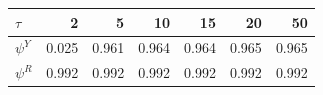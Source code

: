 \begin{tabular}{lrrrrrr}
\toprule
$\tau$ & 2 & 5 & 10 & 15 & 20 & 50 \\
\midrule
$\psi^Y$ & 0.025 & 0.961 & 0.964 & 0.964 & 0.965 & 0.965 \\
$\psi^R$ & 0.992 & 0.992 & 0.992 & 0.992 & 0.992 & 0.992 \\
\bottomrule
\end{tabular}
